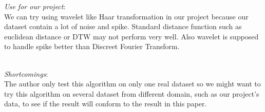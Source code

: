 \begin{itemize*}
\item {\em Use for our project}:\\
We can try using wavelet like Haar transformation in our project because our dataset contain a lot of noise and spike. Standard distance function such as euclidean distance or DTW may not perform very well. Also wavelet is supposed to handle spike better than Discreet Fourier Transform.\\\\
\item {\em Shortcomings}:\\
The author only test this algorithm on only one real dataset so we might want to try this algorithm on several dataset from different domain, such as our project's data, to see if the result will conform to the result in this paper.

\end{itemize*}


